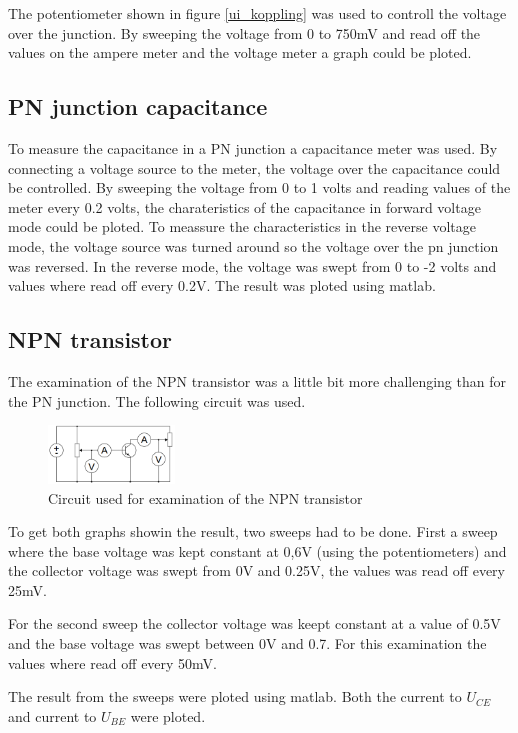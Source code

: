 \documentclass[a4paper]{article}
\begin{document}
The potentiometer shown in figure \ref{ui_koppling} was used to controll the voltage over the junction. By sweeping the voltage from 0 to 750mV and read off the values on the ampere meter and the voltage meter a graph could be ploted.

\subsection{PN junction capacitance}
To measure the capacitance in a PN junction a capacitance meter was used. By connecting a voltage source to the meter, the voltage over the capacitance could be controlled. By sweeping the voltage from 0 to 1 volts and reading values of the meter every 0.2 volts, the charateristics of the capacitance in forward voltage mode could be ploted. To meassure the characteristics in the reverse voltage mode, the voltage source was turned around so the voltage over the pn junction was reversed. In the reverse mode, the voltage was swept from 0 to -2 volts and values where read off every 0.2V. The result was ploted using matlab.

\subsection{NPN transistor}
The examination of the NPN transistor was a little bit more challenging than for the PN junction. The following circuit was used.

\begin{figure}[H]
	\centering
	\includegraphics[width=0.3\textwidth]{npn_circuit.png}
	\caption{Circuit used for examination of the NPN transistor}
	\label{npn_koppling}
\end{figure}
To get both graphs showin the result, two sweeps had to be done. First a sweep where the base voltage was kept constant at 0,6V (using the potentiometers) and the collector voltage was swept from 0V and 0.25V, the values was read off every 25mV.

For the second sweep the collector voltage was keept constant at a value of 0.5V and the base voltage was swept between 0V and 0.7. For this examination the values where read off every 50mV.

The result from the sweeps were ploted using matlab. Both the current to $U_{CE}$ and current to $U_{BE}$ were ploted.
\end{document}
